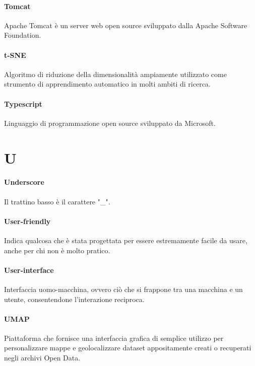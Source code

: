 \documentclass[]{article}
\begin{document}
	\paragraph*{Tomcat}
	Apache Tomcat è un server web open source sviluppato dalla Apache Software Foundation.
	
	\paragraph*{t-SNE}
	Algoritmo di riduzione della dimensionalità ampiamente utilizzato come strumento di apprendimento automatico in molti ambiti di ricerca.
	
	\paragraph*{Typescript}
	Linguaggio di programmazione open source sviluppato da Microsoft.
	
	\newpage
	
	\section*{U}
	
	\paragraph*{Underscore}
	Il trattino basso è il carattere "\_".
	
	\paragraph*{User-friendly}
	Indica qualcosa che è stata progettata per essere estremamente facile da usare, anche per chi non è molto pratico.
	
	\paragraph*{User-interface}
	Interfaccia uomo-macchina, ovvero ciò che si frappone tra una macchina e un utente, consentendone l'interazione reciproca.
	
	\paragraph*{UMAP}
	Piattaforma che fornisce una interfaccia grafica di semplice utilizzo per personalizzare mappe e geolocalizzare dataset appositamente creati o recuperati negli archivi Open Data.
	
\end{document}
